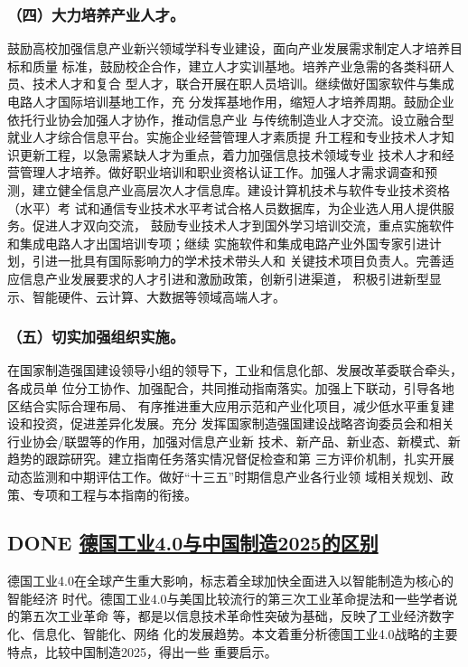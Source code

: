 \documentclass[11pt]{ctexart}
\begin{document}
{{{{\subsubsection{（四）大力培养产业人才。}
\label{sec:org4416bb9}

鼓励高校加强信息产业新兴领域学科专业建设，面向产业发展需求制定人才培养目标和质量
标准，鼓励校企合作，建立人才实训基地。培养产业急需的各类科研人员、技术人才和复合
型人才，联合开展在职人员培训。继续做好国家软件与集成电路人才国际培训基地工作，充
分发挥基地作用，缩短人才培养周期。鼓励企业依托行业协会加强人才协作，推动信息产业
与传统制造业人才交流。设立融合型就业人才综合信息平台。实施企业经营管理人才素质提
升工程和专业技术人才知识更新工程，以急需紧缺人才为重点，着力加强信息技术领域专业
技术人才和经营管理人才培养。做好职业培训和职业资格认证工作。加强人才需求调查和预
测，建立健全信息产业高层次人才信息库。建设计算机技术与软件专业技术资格（水平）考
试和通信专业技术水平考试合格人员数据库，为企业选人用人提供服务。促进人才双向交流，
鼓励专业技术人才到国外学习培训交流，重点实施软件和集成电路人才出国培训专项；继续
实施软件和集成电路产业外国专家引进计划，引进一批具有国际影响力的学术技术带头人和
关键技术项目负责人。完善适应信息产业发展要求的人才引进和激励政策，创新引进渠道，
积极引进新型显示、智能硬件、云计算、大数据等领域高端人才。

\subsubsection{（五）切实加强组织实施。}
\label{sec:orgab3fc8e}

在国家制造强国建设领导小组的领导下，工业和信息化部、发展改革委联合牵头，各成员单
位分工协作、加强配合，共同推动指南落实。加强上下联动，引导各地区结合实际合理布局、
有序推进重大应用示范和产业化项目，减少低水平重复建设和投资，促进差异化发展。充分
发挥国家制造强国建设战略咨询委员会和相关行业协会/联盟等的作用，加强对信息产业新
技术、新产品、新业态、新模式、新趋势的跟踪研究。建立指南任务落实情况督促检查和第
三方评价机制，扎实开展动态监测和中期评估工作。做好“十三五”时期信息产业各行业领
域相关规划、政策、专项和工程与本指南的衔接。


\subsection{{\bfseries\sffamily DONE} \href{https://wenku.baidu.com/view/82acb4f8be23482fb5da4c13.html}{德国工业4.0与中国制造2025的区别}}
\label{sec:org58a5613}
德国工业4.0在全球产生重大影响，标志着全球加快全面进入以智能制造为核心的智能经济
时代。德国工业4.0与美国比较流行的第三次工业革命提法和一些学者说的第五次工业革命
等，都是以信息技术革命性突破为基础，反映了工业经济数字化、信息化、智能化、网络
化的发展趋势。本文着重分析德国工业4.0战略的主要特点，比较中国制造2025，得出一些
重要启示。

}}}}
\end{document}
